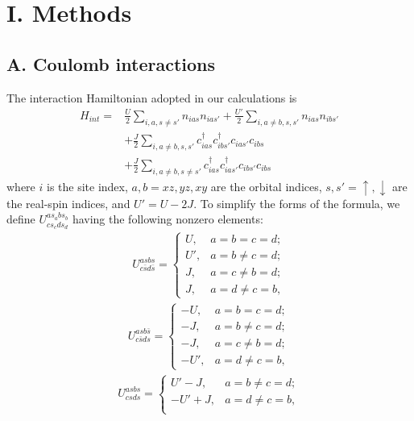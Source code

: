 \documentclass[aps,prl,twocolumn,superscriptaddress,showpacs]{revtex4-1}
\begin{document}
\renewcommand{\theequation}{S\arabic{equation}}
\setcounter{equation}{0}
\renewcommand{\thefigure}{S\arabic{figure}}
\setcounter{figure}{0}
\renewcommand{\thetable}{S\arabic{table}}
\setcounter{table}{0}


\section{I. Methods}
\subsection{A. Coulomb interactions}
The interaction Hamiltonian adopted in our calculations is
\begin{align}\label{Hint1}
H_{int}=&\frac{U}{2}\sum_{i,a,s\neq s'}
n_{ias}n_{ias'}
+\frac{U'}{2}\sum_{i,a\neq b,s,s'}
n_{ias}n_{ibs'}                      \nonumber\\
&+\frac{J}{2}\sum_{i,a\neq b,s,s'}
c^{\dagger}_{ias}
c^{\dagger}_{ibs'}
c_{ias'}c_{ibs}                      \nonumber\\
&+\frac{J}{2}\sum_{i,a\neq b,s\neq s'}
c^{\dagger}_{ias}
c^{\dagger}_{ias'}
c_{ibs'}c_{ibs}
\end{align}
where $i$ is the site index, $a,b=xz,yz,xy$ are the orbital indices, $s,s'=\uparrow,\downarrow$ are the real-spin indices, and $U'=U-2J$. To simplify the forms of the formula, we define $U^{as_abs_b}_{cs_cds_d}$ having the following nonzero elements:
\begin{align}\label{U1}
U^{as bs}
_{c\bar{s}d\bar{s}}
=\left\{
\begin{array}{ll}
U,  & a=b=c=d; \\
U', & a=b\neq c=d; \\
J, & a=c\neq b=d; \\
J,  & a=d\neq c=b,
\end{array}
\right.
\end{align}
\begin{align}\label{U2}
U^{as b\bar{s}}
_{c\bar{s}ds}
=\left\{
\begin{array}{ll}
-U,  & a=b=c=d; \\
-J, & a=b\neq c=d; \\
-J, & a=c\neq b=d; \\
-U',  & a=d\neq c=b,
\end{array}
\right.
\end{align}
\begin{align}\label{U3}
U^{as bs}
_{cs ds}
=\left\{
\begin{array}{ll}
U'-J,  & a=b\neq c=d;  \\
-U'+J, & a=d\neq c=b,  \\
\end{array}
\right.
\end{align}
\end{document}
